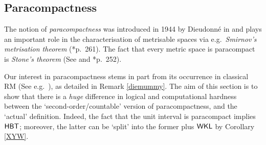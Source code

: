\documentclass[reqno]{amsart}
\def\WKL{\textup{\textsf{WKL}}}
\def\HBT{\textup{\textsf{HBT}}}
\numberwithin{equation}{section}
\numberwithin{thm}{section}
\begin{document}
\subsection{Paracompactness}\label{diemensie2}
The notion of \emph{paracompactness} was introduced in 1944 by Dieudonn\'e in \cite{nogeengodsgeschenk} and plays an important role in the characterisation of metrisable spaces via e.g.\ \emph{Smirnov's metrisation theorem} (\cite{munkies}*{p.\ 261}).  
The fact that every metric space is paracompact is \emph{Stone's theorem} (See \cites{goodgoing,stoner2} and \cite{munkies}*{p.\ 252}). 

\smallskip

Our interest in paracompactness stems in part from its occurrence in classical RM (See e.g.\ \cites{simpson2, mummymf, mummyphd}), as detailed in Remark \ref{diemummy}.  
The aim of this section is to show that there is a \emph{huge} difference in logical and computational hardness between the `second-order/countable' version of paracompactness, and the `actual' definition.  
Indeed, the fact that the unit interval is paracompact implies $\HBT$; moreover, the latter can be `split' into the former plus $\WKL$ by Corollary \ref{XYW}.  

\smallskip
\end{document}

